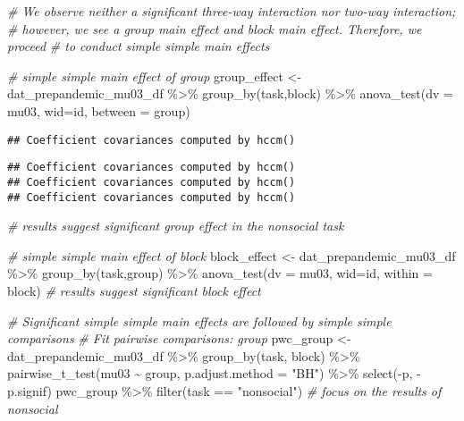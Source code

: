 \documentclass[
]{article}
\newenvironment{Shaded}{\begin{snugshade}}{\end{snugshade}}
\newcommand{\AttributeTok}[1]{\textcolor[rgb]{0.77,0.63,0.00}{#1}}
\newcommand{\CommentTok}[1]{\textcolor[rgb]{0.56,0.35,0.01}{\textit{#1}}}
\newcommand{\FunctionTok}[1]{\textcolor[rgb]{0.00,0.00,0.00}{#1}}
\newcommand{\NormalTok}[1]{#1}
\newcommand{\OtherTok}[1]{\textcolor[rgb]{0.56,0.35,0.01}{#1}}
\newcommand{\SpecialCharTok}[1]{\textcolor[rgb]{0.00,0.00,0.00}{#1}}
\newcommand{\StringTok}[1]{\textcolor[rgb]{0.31,0.60,0.02}{#1}}
\begin{document}
\begin{Shaded}
\begin{Highlighting}[]
\CommentTok{\# We observe neither a significant three{-}way interaction nor two{-}way interaction;}
\CommentTok{\# however, we see a group main effect and block main effect. Therefore, we proceed}
\CommentTok{\# to conduct simple simple main effects}

\CommentTok{\# simple simple main effect of group}
\NormalTok{group\_effect }\OtherTok{\textless{}{-}}\NormalTok{ dat\_prepandemic\_mu03\_df }\SpecialCharTok{\%\textgreater{}\%}
  \FunctionTok{group\_by}\NormalTok{(task,block) }\SpecialCharTok{\%\textgreater{}\%}
  \FunctionTok{anova\_test}\NormalTok{(}\AttributeTok{dv =}\NormalTok{ mu03, }\AttributeTok{wid=}\NormalTok{id, }\AttributeTok{between =}\NormalTok{ group)}
\end{Highlighting}
\end{Shaded}

\begin{verbatim}
## Coefficient covariances computed by hccm()
\end{verbatim}

\begin{verbatim}
## Coefficient covariances computed by hccm()
## Coefficient covariances computed by hccm()
## Coefficient covariances computed by hccm()
\end{verbatim}

\begin{Shaded}
\begin{Highlighting}[]
\CommentTok{\# results suggest significant group effect in the nonsocial task}

\CommentTok{\# simple simple main effect of block}
\NormalTok{block\_effect }\OtherTok{\textless{}{-}}\NormalTok{ dat\_prepandemic\_mu03\_df }\SpecialCharTok{\%\textgreater{}\%}
  \FunctionTok{group\_by}\NormalTok{(task,group) }\SpecialCharTok{\%\textgreater{}\%}
  \FunctionTok{anova\_test}\NormalTok{(}\AttributeTok{dv =}\NormalTok{ mu03, }\AttributeTok{wid=}\NormalTok{id, }\AttributeTok{within =}\NormalTok{ block)}
\CommentTok{\# results suggest significant block effect}

\CommentTok{\# Significant simple simple main effects are followed by simple simple comparisons}
\CommentTok{\# Fit pairwise comparisons: group}
\NormalTok{pwc\_group }\OtherTok{\textless{}{-}}\NormalTok{ dat\_prepandemic\_mu03\_df }\SpecialCharTok{\%\textgreater{}\%}
  \FunctionTok{group\_by}\NormalTok{(task, block) }\SpecialCharTok{\%\textgreater{}\%}
  \FunctionTok{pairwise\_t\_test}\NormalTok{(mu03 }\SpecialCharTok{\textasciitilde{}}\NormalTok{ group, }\AttributeTok{p.adjust.method =} \StringTok{"BH"}\NormalTok{) }\SpecialCharTok{\%\textgreater{}\%}
  \FunctionTok{select}\NormalTok{(}\SpecialCharTok{{-}}\NormalTok{p, }\SpecialCharTok{{-}}\NormalTok{p.signif)}
\NormalTok{pwc\_group }\SpecialCharTok{\%\textgreater{}\%} \FunctionTok{filter}\NormalTok{(task }\SpecialCharTok{==} \StringTok{"nonsocial"}\NormalTok{) }\CommentTok{\# focus on the results of nonsocial}
\end{Highlighting}
\end{Shaded}
\end{document}
